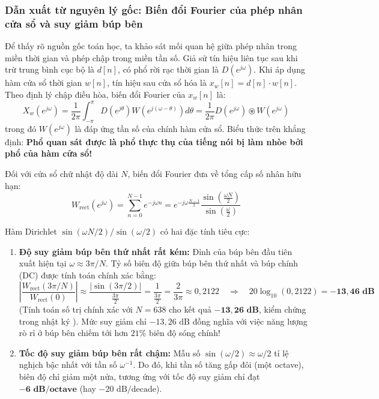 \subsubsection*{Dẫn xuất từ nguyên lý gốc: Biến đổi Fourier của phép nhân cửa sổ và suy giảm búp bên}
Để thấy rõ nguồn gốc toán học, ta khảo sát mối quan hệ giữa phép nhân trong miền thời gian và phép chập trong miền tần số. Giả sử tín hiệu liên tục sau khi trừ trung bình cục bộ là $d[n]$, có phổ rời rạc thời gian là $D(e^{j\omega})$. Khi áp dụng hàm cửa sổ thời gian $w[n]$, tín hiệu sau cửa sổ hóa là $x_w[n] = d[n] \cdot w[n]$. Theo định lý chập điều hòa, biến đổi Fourier của $x_w[n]$ là:
\begin{equation}
X_w(e^{j\omega}) = \frac{1}{2\pi} \int_{-\pi}^{\pi} D(e^{j\theta}) W(e^{j(\omega - \theta)}) d\theta = \frac{1}{2\pi} D(e^{j\omega}) \circledast W(e^{j\omega})
\end{equation}
trong đó $W(e^{j\omega})$ là đáp ứng tần số của chính hàm cửa sổ. Biểu thức trên khẳng định: \textbf{Phổ quan sát được là phổ thực thụ của tiếng nói bị làm nhòe bởi phổ của hàm cửa sổ!}

Đối với cửa sổ chữ nhật độ dài $N$, biến đổi Fourier đưa về tổng cấp số nhân hữu hạn:
\begin{equation}
W_{\text{rect}}(e^{j\omega}) = \sum_{n=0}^{N-1} e^{-j\omega n} = e^{-j\omega \frac{N-1}{2}} \frac{\sin\left(\frac{\omega N}{2}\right)}{\sin\left(\frac{\omega}{2}\right)}
\end{equation}

Hàm Dirichlet $\sin(\omega N/2) / \sin(\omega/2)$ có hai đặc tính tiêu cực:
\begin{enumerate}[leftmargin=1.5em, itemsep=2pt]
    \item \textbf{Độ suy giảm búp bên thứ nhất rất kém:} Đỉnh của búp bên đầu tiên xuất hiện tại $\omega \approx 3\pi / N$. Tỷ số biên độ giữa búp bên thứ nhất và búp chính (DC) được tính toán chính xác bằng:
    \begin{equation}
    \left| \frac{W_{\text{rect}}(3\pi/N)}{W_{\text{rect}}(0)} \right| \approx \frac{\left| \sin(3\pi/2) \right|}{\frac{3\pi}{2}} = \frac{1}{\frac{3\pi}{2}} = \frac{2}{3\pi} \approx 0{,}2122 \quad \Longrightarrow \quad 20 \log_{10}(0{,}2122) = \mathbf{-13{,}46\text{ dB}}
    \end{equation}
    (Tính toán số trị chính xác với $N = 638$ cho kết quả $\mathbf{-13{,}26\text{ dB}}$, kiểm chứng trong nhật ký ). Mức suy giảm chỉ $-13{,}26\text{ dB}$ đồng nghĩa với việc năng lượng rò rỉ ở búp bên chiếm tới hơn $21\%$ biên độ sóng chính!
    \item \textbf{Tốc độ suy giảm búp bên rất chậm:} Mẫu số $\sin(\omega/2) \approx \omega/2$ tỉ lệ nghịch bậc nhất với tần số $\omega^{-1}$. Do đó, khi tần số tăng gấp đôi (một octave), biên độ chỉ giảm một nửa, tương ứng với tốc độ suy giảm chỉ đạt $\mathbf{-6\text{ dB/octave}}$ (hay $-20\text{ dB/decade}$).
\end{enumerate}

